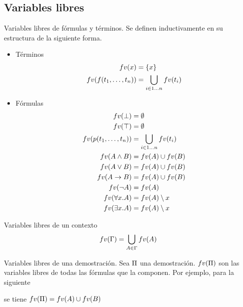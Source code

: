 \subsection{Variables libres}

\begin{definition}{Variables libres de fórmulas y términos}. Se definen inductivamente en su estructura de la siguiente forma.

    \begin{itemize}
        \item Términos
        \begin{align*}
            fv(x) &= \{ x \}\\
            fv(f(t_1, \dots, t_n)) &= \bigcup_{i \in 1\dots n} fv(t_i) 
        \end{align*}
    
        \item Fórmulas
        \begin{align*}    
            fv(\bot) &=\emptyset\\
            fv(\top) &=\emptyset \\
            fv(p(t_1, \dots, t_n)) &= \bigcup_{i \in 1\dots n} fv(t_i) \\
            fv(A \wedge B) &= fv(A) \cup fv(B)\\
            fv(A \vee B) &=fv(A) \cup fv(B)\\
            fv(A \to B) &=fv(A) \cup fv(B)\\
            fv(\neg A) &=fv(A)\\
            fv(\forall x . A) &= fv(A) \setminus x \\
            fv(\exists x . A) &= fv(A) \setminus x
        \end{align*}

    \end{itemize}
\end{definition}

\begin{definition}{Variables libres de un contexto}
    \[
        fv(\Gamma) = \bigcup_{A \in \Gamma} fv(A)
    \]
\end{definition}

\begin{definition}{Variables libres de una demostración.} Sea $\Pi$ una demostración. $fv(\Pi)$ son las variables libres de todas las fórmulas que la componen. Por ejemplo, para la siguiente

    \proofTreeAndI

    se tiene $fv(\Pi) = fv(A) \cup fv(B)$
    
\end{definition}
